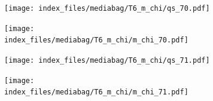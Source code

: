 \documentclass[
  11pt,
  letterpaper,
]{scrreprt}
\begin{document}
\begin{figure}

\begin{minipage}{0.50\linewidth}

\begin{figure}[H]

{\centering \texttt{[image: index\_files/mediabag/T6\_m\_chi/qs\_70.pdf]}

}


\end{figure}%

\end{minipage}%
%
\begin{minipage}{0.50\linewidth}

\begin{figure}[H]

{\centering \texttt{[image: index\_files/mediabag/T6\_m\_chi/m\_chi\_70.pdf]}

}


\end{figure}%

\end{minipage}%

\end{figure}%

\begin{figure}

\begin{minipage}{0.50\linewidth}

\begin{figure}[H]

{\centering \texttt{[image: index\_files/mediabag/T6\_m\_chi/qs\_71.pdf]}

}


\end{figure}%

\end{minipage}%
%
\begin{minipage}{0.50\linewidth}

\begin{figure}[H]

{\centering \texttt{[image: index\_files/mediabag/T6\_m\_chi/m\_chi\_71.pdf]}

}


\end{figure}%

\end{minipage}%

\end{figure}%
\end{document}
